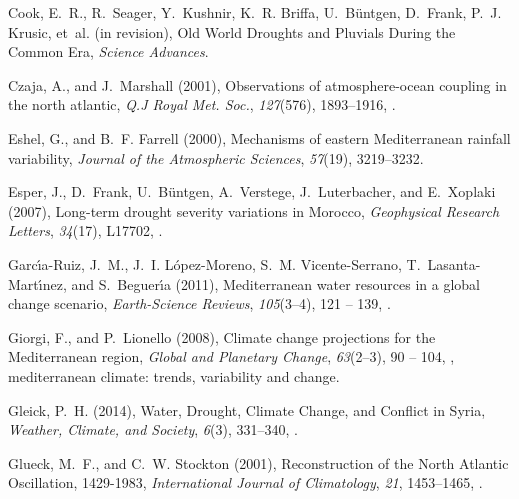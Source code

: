 \documentclass[draft,jgr]{AGUTeX}
\begin{document}
\begin{article}
\begin{thebibliography}{74}
Cook, E.~R., R.~Seager, Y.~Kushnir, K.~R. Briffa, U.~B{\"u}ntgen, D.~Frank,
  P.~J. Krusic, et~al. (in revision), {Old World Droughts and Pluvials During
  the Common Era}, \textit{{Science Advances}}.

Czaja, A., and J.~Marshall (2001), Observations of atmosphere-ocean coupling in
  the north atlantic, \textit{Q.J Royal Met. Soc.}, \textit{127}(576),
  1893--1916, .

Eshel, G., and B.~F. Farrell (2000), {Mechanisms of eastern Mediterranean
  rainfall variability}, \textit{Journal of the Atmospheric Sciences},
  \textit{57}(19), 3219--3232.

Esper, J., D.~Frank, U.~B{\"u}ntgen, A.~Verstege, J.~Luterbacher, and
  E.~Xoplaki (2007), {Long-term drought severity variations in Morocco},
  \textit{Geophysical Research Letters}, \textit{34}(17), L17702,
  .

Garc{\'\i}a-Ruiz, J.~M., J.~I. L{\'o}pez-Moreno, S.~M. Vicente-Serrano,
  T.~Lasanta-Mart{\'\i}nez, and S.~Beguer{\'\i}a (2011), {Mediterranean water
  resources in a global change scenario}, \textit{Earth-Science Reviews},
  \textit{105}(3--4), 121 -- 139,
  .

Giorgi, F., and P.~Lionello (2008), {Climate change projections for the
  Mediterranean region}, \textit{Global and Planetary Change},
  \textit{63}(2--3), 90 -- 104,
  , mediterranean
  climate: trends, variability and change.

Gleick, P.~H. (2014), {Water, Drought, Climate Change, and Conflict in Syria},
  \textit{Weather, Climate, and Society}, \textit{6}(3), 331--340,
  .

Glueck, M.~F., and C.~W. Stockton (2001), {Reconstruction of the {North
  Atlantic Oscillation}, 1429-1983}, \textit{International Journal of
  Climatology}, \textit{21}, 1453--1465, .


\end{thebibliography}
\end{article}
\end{document}
